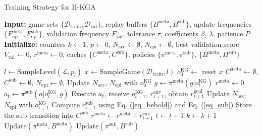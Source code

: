 \documentclass[11pt]{article}
\begin{document}
\begin{algorithm}[t!]
\small
\caption{Training Strategy for H-KGA}
\label{algo_Training}
\textbf{Input:} 
game sets $\{ \mathcal{D}_{\text{train}}, \mathcal{D}_{\text{val}} \}$,
replay buffers $\{B^{\text{meta}}, B^{\text{sub}}\}$, 
update frequencies $\{F_{\text{up}}^{\text{meta}},F_{\text{up}}^{\text{sub}}\}$,
validation frequency $F_{\text{val}}$,
tolerance $\tau$,
coefficients $\beta$, $\lambda$, 
patience $P$ \\
\textbf{Initialize:} 
counters $k \leftarrow 1$, $p \leftarrow 0$, 
$N_{\text{acc}} \leftarrow \emptyset$, $N_{\text{epi}} \leftarrow \emptyset$, 
best validation score $V_{\text{val}} \leftarrow 0$, 
$r^{\text{meta}} \leftarrow 0$,
caches $\{ C^{\text{meta}}, C^{\text{sub}} \}$, 
policies $\{ \pi^{\text{meta}}, \pi^{\text{sub}} \}$, $\{ \Pi^{\text{meta}}, \Pi^{\text{sub}} \}$
\begin{algorithmic}[1]
    \State $l \leftarrow \text{SampleLevel}(\mathcal{L },p_l)$
    \State $x \leftarrow \text{SampleGame}(\mathcal{D}_{\text{train}}, l)$
    \State $o_0^{\text{KG}} \leftarrow$ reset $x$ 
    \State $C^{\text{meta}} \leftarrow \emptyset$,
           $C^{\text{sub}} \leftarrow \emptyset$, 
           $N_{\text{epi}} \leftarrow \emptyset$,
    \State Update $N_{\text{acc}}$, $N_{\text{epi}}$ with $o_0^{\text{KG}}$
        \State $g \leftarrow \pi^{\text{meta}}(g|o_t^{\text{KG}})$
        \State $r^{\text{meta}} \leftarrow 0$
            \State $a_t \leftarrow \pi^{\text{sub}}(a|o_t^{\text{KG}}, g)$
            \State Execute $a_t$, receive $o_{t+1}^{\text{KG}}$, $r_{t+1}^{\text{env}}$, obtain $r_{t+1}^{\text{goal}}$
            \State Update $N_{\text{acc}}$, $N_{\text{epi}}$ with $o_{t+1}^{\text{KG}}$
            \State Compute $r_{t+1}^{\text{sub}}$ using Eq. (\ref{eq_bebold}) and Eq. (\ref{eq_sub})
            \State Store the sub transition into $C^{\text{sub}}$
            \State $r^{\text{meta}} \leftarrow r^{\text{meta}} + r_{t+1}^{\text{env}}$
            \State $t \leftarrow t+1$
            \State $k \leftarrow k+1$
                \State $\text{Update}(\pi^{\text{meta}}, B^{\text{meta}})$
            \EndIf
                \State $\text{Update}(\pi^{\text{sub}}, B^{\text{sub}})$

\end{algorithmic}
\end{algorithm}
\end{document}
